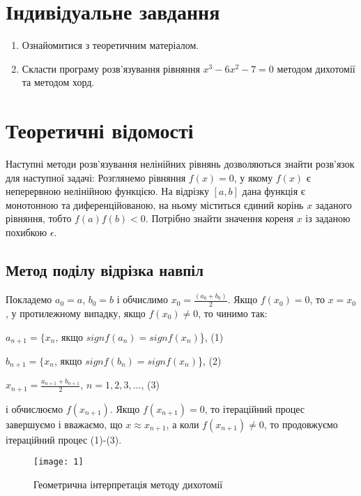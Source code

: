\documentclass{article}
\begin{document}
\begin{normalsize}
	\section*{Індивідуальне завдання}

	\begin{enumerate}{}
		\item Ознайомитися з теоретичним матеріалом.
		\item Скласти програму розв’язування рівняння $x^3-6x^2-7=0$ методом дихотомії та методом хорд.
	\end{enumerate}
	
	\section*{Теоретичні відомості}
	
	Наступні методи розв’язування нелінійних рівнянь дозволяються знайти розв’язок для наступної задачі: Розглянемо рівняння $f(x) = 0$, у якому $f(x)$ є неперервною нелінійною функцією. На відрізку $[a, b]$ дана функція є монотонною та диференційованою, на ньому міститься єдиний корінь $x$ заданого рівняння, тобто $f(a)f(b) < 0$. Потрібно знайти значення кореня $x$ із заданою похибкою $\epsilon$.
	
	\subsection*{Метод поділу відрізка навпіл}
	
	Покладемо $a_0 = a$, $b_0 = b$ і обчислимо $x_0 = \frac{(a_0 + b_0)}{2}$. Якщо $f(x_0) = 0$, то $x = x_0$, у протилежному випадку, якщо $f(x_0) \neq 0$, то чинимо так: 
	\begin{list}{}{}
		\item $a_{n+1} = \{x_n$, якщо $sign f(a_n) = sign f(x_n)$\}, (1)
		\item $b_{n+1} = \{x_n$, якщо $sign f(b_n) = sign f(x_n)$\}, (2)
		\item $x_{n+1} = \frac{a_{n+1}+b_{n+1}}{2}$, $n = 1, 2, 3, ...$, (3)
	\end{list}
	і обчислюємо $f(x_{n+1})$. Якщо $f(x_{n+1}) = 0$, то ітераційний процес завершуємо і вважаємо, що $x \approx x_{n+1}$, а коли $f(x_{n+1}) \neq 0$, то продовжуємо ітераційний процес (1)-(3).
	
	\begin{figure}[h!]
		\centering
		\texttt{[image: 1]}
		\caption{Геометрична інтерпретація методу дихотомії}
	\end{figure}


\end{normalsize}
\end{document}
